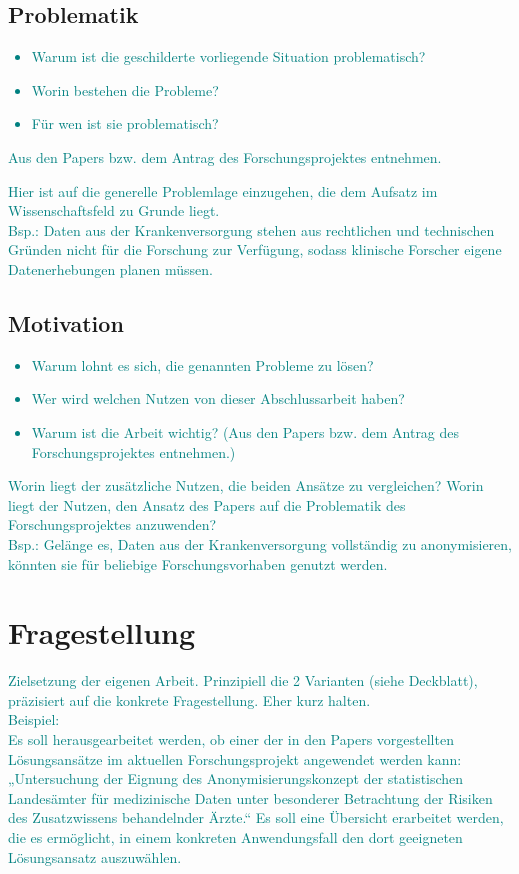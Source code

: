 \documentclass[headsepline,titlepage,twoside,12pt]{report}
\newcommand\todo[1]{\textcolor{teal}{#1}}%
\begin{document}
\subsection{Problematik}
\todo{
\begin{itemize}
\item Warum ist die geschilderte vorliegende Situation problematisch?
\item Worin bestehen die Probleme?
\item Für wen ist sie problematisch?
\end{itemize}
Aus den Papers bzw. dem Antrag des Forschungsprojektes entnehmen.\\
}
\todo{
Hier ist auf die generelle Problemlage einzugehen, die dem Aufsatz im Wissenschaftsfeld zu Grunde liegt.\\
Bsp.: Daten aus der Krankenversorgung stehen aus rechtlichen und technischen Gründen nicht für die Forschung zur Verfügung, sodass klinische Forscher eigene Datenerhebungen planen müssen.
}
\subsection{Motivation}
\todo{
\begin{itemize}
\item Warum lohnt es sich, die genannten Probleme zu lösen?
\item Wer wird welchen Nutzen von dieser Abschlussarbeit haben?
\item Warum ist die Arbeit wichtig? (Aus den Papers bzw. dem Antrag des Forschungsprojektes entnehmen.)
\end{itemize}
}
\todo{
Worin liegt der zusätzliche Nutzen, die beiden Ansätze zu vergleichen? Worin liegt der Nutzen, den Ansatz des Papers auf die Problematik des Forschungsprojektes anzuwenden?\\
Bsp.: Gelänge es, Daten aus der Krankenversorgung vollständig zu anonymisieren, könnten sie für beliebige Forschungsvorhaben genutzt werden.
}

\section{Fragestellung}
\todo{
Zielsetzung der eigenen Arbeit. Prinzipiell die 2 Varianten (siehe Deckblatt), präzisiert auf die konkrete Fragestellung. Eher kurz halten.\\
Beispiel:\\
Es soll herausgearbeitet werden, ob einer der in den Papers vorgestellten Lösungsansätze im aktuellen Forschungsprojekt angewendet werden kann: „Untersuchung der Eignung des Anonymisierungskonzept der statistischen Landesämter für medizinische Daten unter besonderer Betrachtung der Risiken des Zusatzwissens behandelnder Ärzte.“
Es soll eine Übersicht erarbeitet werden, die es ermöglicht, in einem konkreten Anwendungsfall den dort geeigneten Lösungsansatz auszuwählen.
}
\end{document}
